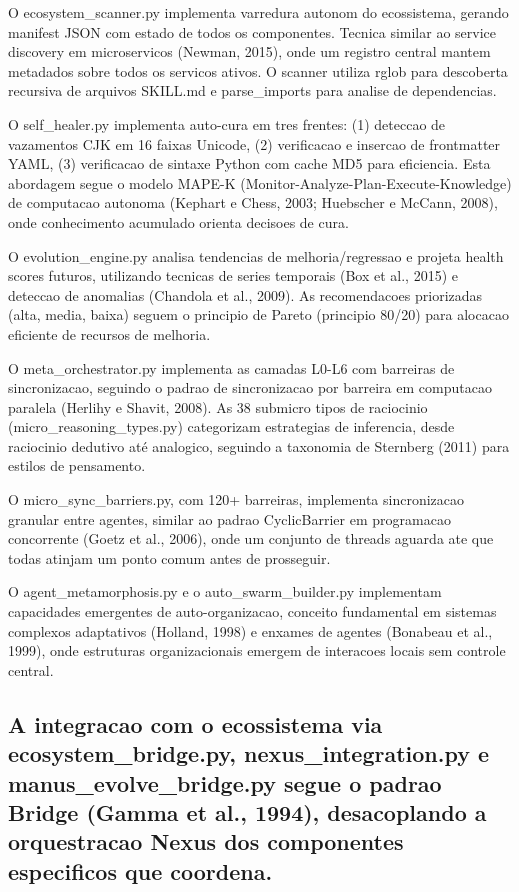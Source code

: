 \documentclass[
  12pt,
]{article}
\begin{document}
O ecosystem\_scanner.py implementa varredura autonom do ecossistema,
gerando manifest JSON com estado de todos os componentes. Tecnica
similar ao service discovery em microservicos (Newman, 2015), onde um
registro central mantem metadados sobre todos os servicos ativos. O
scanner utiliza rglob para descoberta recursiva de arquivos SKILL.md e
parse\_imports para analise de dependencias.

O self\_healer.py implementa auto-cura em tres frentes: (1) deteccao de
vazamentos CJK em 16 faixas Unicode, (2) verificacao e insercao de
frontmatter YAML, (3) verificacao de sintaxe Python com cache MD5 para
eficiencia. Esta abordagem segue o modelo MAPE-K
(Monitor-Analyze-Plan-Execute-Knowledge) de computacao autonoma (Kephart
e Chess, 2003; Huebscher e McCann, 2008), onde conhecimento acumulado
orienta decisoes de cura.

O evolution\_engine.py analisa tendencias de melhoria/regressao e
projeta health scores futuros, utilizando tecnicas de series temporais
(Box et al., 2015) e deteccao de anomalias (Chandola et al., 2009). As
recomendacoes priorizadas (alta, media, baixa) seguem o principio de
Pareto (principio 80/20) para alocacao eficiente de recursos de
melhoria.

O meta\_orchestrator.py implementa as camadas L0-L6 com barreiras de
sincronizacao, seguindo o padrao de sincronizacao por barreira em
computacao paralela (Herlihy e Shavit, 2008). As 38 submicro tipos de
raciocinio (micro\_reasoning\_types.py) categorizam estrategias de
inferencia, desde raciocinio dedutivo até analogico, seguindo a
taxonomia de Sternberg (2011) para estilos de pensamento.

O micro\_sync\_barriers.py, com 120+ barreiras, implementa sincronizacao
granular entre agentes, similar ao padrao CyclicBarrier em programacao
concorrente (Goetz et al., 2006), onde um conjunto de threads aguarda
ate que todas atinjam um ponto comum antes de prosseguir.

O agent\_metamorphosis.py e o auto\_swarm\_builder.py implementam
capacidades emergentes de auto-organizacao, conceito fundamental em
sistemas complexos adaptativos (Holland, 1998) e enxames de agentes
(Bonabeau et al., 1999), onde estruturas organizacionais emergem de
interacoes locais sem controle central.

\subsection{A integracao com o ecossistema via ecosystem\_bridge.py,
nexus\_integration.py e manus\_evolve\_bridge.py segue o padrao Bridge
(Gamma et al., 1994), desacoplando a orquestracao Nexus dos componentes
especificos que
coordena.}\label{a-integracao-com-o-ecossistema-via-ecosystem_bridge.py-nexus_integration.py-e-manus_evolve_bridge.py-segue-o-padrao-bridge-gamma-et-al.-1994-desacoplando-a-orquestracao-nexus-dos-componentes-especificos-que-coordena.}
\end{document}
